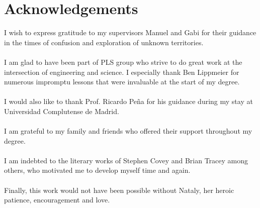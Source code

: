\documentclass[preamble.tex]{subfiles}
\begin{document}
\chapter*{Acknowledgements}

I wish to express gratitude to my supervisors Manuel and Gabi for their guidance in the times of confusion and exploration of unknown territories.\\\\I am glad to have been part of PLS group who strive to do great work at the intersection of engineering and science. I especially thank Ben Lippmeier for numerous impromptu lessons that were invaluable at the start of my degree.\\\\I would also like to thank Prof. Ricardo Peña for his guidance during my stay at Universidad Complutense de Madrid.\\\\I am grateful to my family and friends who offered their support throughout my degree.\\\\I am indebted to the literary works of Stephen Covey and Brian Tracey among others, who motivated me to develop myself time and again.\\\\Finally, this work would not have been possible without Nataly, her heroic patience, encouragement and love.
\end{document}
